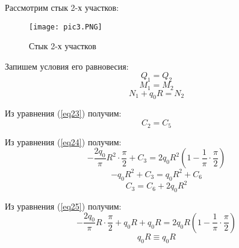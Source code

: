 Рассмотрим стык 2-х участков:
\begin{figure}[H]
    \begin{center}
        \texttt{[image: pic3.PNG]}
        \caption{Стык 2-х участков}
        \label{pic3}
    \end{center}
\end{figure}

Запишем условия его равновесия:
\begin{equation}
    \label{eq23}
    Q_1 = Q_2
\end{equation}
\begin{equation}
    \label{eq24}
    M_1 = M_2
\end{equation}
\begin{equation}
    \label{eq25}
    N_1 + q_0R = N_2
\end{equation}

Из уравнения (\ref{eq23}) получим:
\begin{equation}
    \label{eq26}
    C_2 = C_5
\end{equation}

Из уравнения (\ref{eq24}) получим:
\begin{equation}
    \label{eq27}
    - \frac{2q_0}{\pi}R^2 \cdot \frac{\pi}{2} + C_3 = 2q_0R^2 (1 - \frac{1}{\pi} \cdot \frac{\pi}{2})
\end{equation}
\begin{equation}
    \label{eq28}
    - q_0R^2 + C_3 = q_0R^2 + C_6
\end{equation}
\begin{equation}
    \label{eq29}
    C_3 = C_6 + 2q_0R^2
\end{equation}

Из уравнения (\ref{eq25}) получим:
\begin{equation}
    \label{eq30}
    - \frac{2q_0}{\pi}R \cdot \frac{\pi}{2} + q_0R + q_0R = 2q_0R (1 - \frac{1}{\pi} \cdot \frac{\pi}{2})
\end{equation}
\begin{equation}
    \label{eq31}
    q_0R \equiv q_0R
\end{equation}

